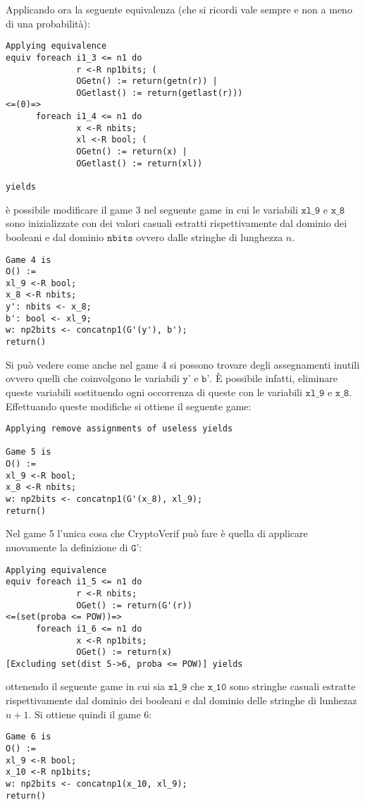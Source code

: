 \documentclass[a4paper,openright,twoside,12pt]{report}
\begin{document}
Applicando ora la seguente equivalenza (che si ricordi vale sempre e non a meno di una probabilit\`a):
\begin{verbatim} 
Applying equivalence
equiv foreach i1_3 <= n1 do 
              r <-R np1bits; (
              OGetn() := return(getn(r)) |
              OGetlast() := return(getlast(r)))
<=(0)=>
      foreach i1_4 <= n1 do 
              x <-R nbits; 
              xl <-R bool; (
              OGetn() := return(x) |
              OGetlast() := return(xl))

yields
\end{verbatim}
\`e possibile modificare il game 3 nel seguente game in cui le variabili $\texttt{xl\_9}$ e $\texttt{x\_8}$ sono inizializzate con dei valori casuali estratti rispettivamente dal dominio dei booleani e dal dominio
$\texttt{nbits}$ ovvero dalle stringhe di lunghezza $n$.
\begin{verbatim} 
Game 4 is
O() :=
xl_9 <-R bool;
x_8 <-R nbits;
y': nbits <- x_8;
b': bool <- xl_9;
w: np2bits <- concatnp1(G'(y'), b');
return()
\end{verbatim}
Si pu\`o vedere come anche nel game 4 si possono trovare degli assegnamenti inutili ovvero quelli che coinvolgono le variabili $\texttt{y'}$ e $\texttt{b'}$. \`E possibile infatti, eliminare queste variabili
sostituendo ogni occorrenza di queste con le variabili $\texttt{xl\_9}$ e $\texttt{x\_8}$. Effettuando queste modifiche si ottiene il seguente game:
\begin{verbatim} 
Applying remove assignments of useless yields

Game 5 is
O() :=
xl_9 <-R bool;
x_8 <-R nbits;
w: np2bits <- concatnp1(G'(x_8), xl_9);
return()
\end{verbatim}
Nel game 5 l'unica cosa che CryptoVerif pu\`o fare \`e quella di applicare nuovamente la definizione di $\texttt{G'}$:
\begin{verbatim}
Applying equivalence
equiv foreach i1_5 <= n1 do 
              r <-R nbits; 
              OGet() := return(G'(r))
<=(set(proba <= POW))=>
      foreach i1_6 <= n1 do 
              x <-R np1bits; 
              OGet() := return(x)
[Excluding set(dist 5->6, proba <= POW)] yields
\end{verbatim}
ottenendo il seguente game in cui sia $\texttt{xl\_9}$ che $\texttt{x\_10}$ sono stringhe casuali estratte rispettivamente dal dominio dei booleani e dal dominio delle stringhe di lunhezaz $n+1$. Si ottiene quindi il game 6:
\begin{verbatim}
Game 6 is
O() :=
xl_9 <-R bool;
x_10 <-R np1bits;
w: np2bits <- concatnp1(x_10, xl_9);
return()
\end{verbatim}
\end{document}
